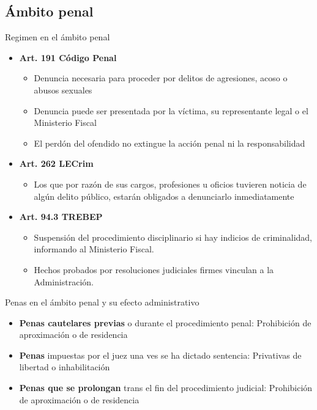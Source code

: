 \documentclass{beamer}
\begin{document}
    \subsection{Ámbito penal}
    \begin{frame}{Regimen en el ámbito penal}
        \begin{itemize}
            \item \textbf{Art. 191 Código Penal}
            \begin{itemize}
                \item Denuncia necesaria para proceder por delitos de agresiones, acoso o abusos sexuales
                \item Denuncia puede ser presentada por la víctima, su representante legal o el Ministerio Fiscal
                \item El perdón del ofendido no extingue la acción penal ni la responsabilidad
            \end{itemize}
            \item \textbf{Art. 262 LECrim}
            \begin{itemize}
                \item Los que por razón de sus cargos, profesiones u oficios tuvieren noticia de algún delito público, estarán obligados a denunciarlo inmediatamente
            \end{itemize}
            \item \textbf{Art. 94.3 TREBEP}
            \begin{itemize}
                \item Suspensión del procedimiento disciplinario si hay indicios de criminalidad, informando al Ministerio Fiscal.
                \item Hechos probados por resoluciones judiciales firmes vinculan a la Administración.
            \end{itemize}
        \end{itemize}
    \end{frame}

    \begin{frame}{Penas en el ámbito penal y su efecto administrativo}
        \begin{itemize}
            \item \textbf{Penas cautelares previas} o durante el procedimiento penal: Prohibición de aproximación o de residencia
            \item \textbf{Penas} impuestas por el juez una ves se ha dictado sentencia: Privativas de libertad o inhabilitación
            \item \textbf{Penas que se prolongan} trans el fin del procedimiento judicial: Prohibición de aproximación o de residencia
        \end{itemize}
    \end{frame}
\end{document}
